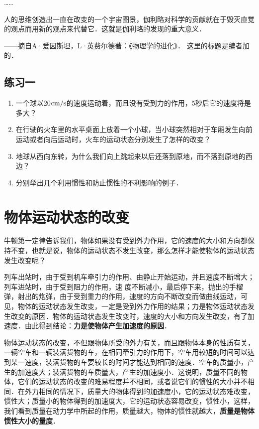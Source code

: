 ……

人的思维创造出一直在改变的一个宇宙图景，伽利略对科学的贡献就在于毁灭直觉的观点而用新的观点来代替它．这就是伽利略的发现的重大意义．


——摘自A·爱因斯坦，L·英费尔德著：《物理学的进化》．
这里的标题是编者加的．

\subsection*{练习一}
\begin{enumerate}
	 \item 一个球以20${\rm cm/s}$的速度运动着，而且没有受到力的作用，5秒后它的速度将是多大？
	 \item 在行驶的火车里的水平桌面上放着一个小球，当小球突然相对于车厢发生向前运动或者向后运动时，火车的运动状态分别发生了怎样的改变？
	 \item 地球从西向东转，为什么我们向上跳起来以后还落到原地，而不落到原地的西边？
	 \item 分别举出几个利用惯性和防止惯性的不利影响的例子．
\end{enumerate}

\section{物体运动状态的改变}
牛顿第一定律告诉我们，物体如果没有受到外力作用，它的速度的大小和方向都保持不变，也就是说，物体的运动状态不发生改变，那么怎样才能使物体的运动状态发生改变呢？

列车出站时，由于受到机车牵引力的作用、由静止开始运动，并且速度不断增大；列车进站时，由于受到阻力的作用，速
度不断减小，最后停下来，抛出的手榴弹，射出的炮弹，由于受到重力的作用，速度的方向不断改变而做曲线运动，可见，物体的运动状态发生改变，一定是受到外力作用的结果；力是物体运动状态发生改变的原因．物体的运动状态发生改变时，速度的大小和方向发生改变，有了加速度．由此得到结论：\textbf{力是使物体产生加速度的原因}．

物体运动状态的改变，不但跟物体所受的外力有关，而且跟物体本身的性质有关，一辆空车和一辆装满货物的车，在相同牵引力的作用下，空车用较短的时间可以达到某一速度，装满货物的车要较长的时间才能达到相同的速度．空车的质量小，产生的加速度大；装满货物的车质量大，产生的加速度小．这说明，质量不同的物体，它们的运动状态的改变的难易程度并不相同，或者说它们的惯性的大小并不相同．在外力相同的情况下，质量大的物体得到的加速度小，它的运动状态难改变，惯性大；质量小的物体得到的加速度大，它的运动状态容易改变，惯性小，这样，我们看到质量在动力学中所起的作用，质量越大，物体的惯性就越大，\textbf{质量是物体惯性大小的量度}．

